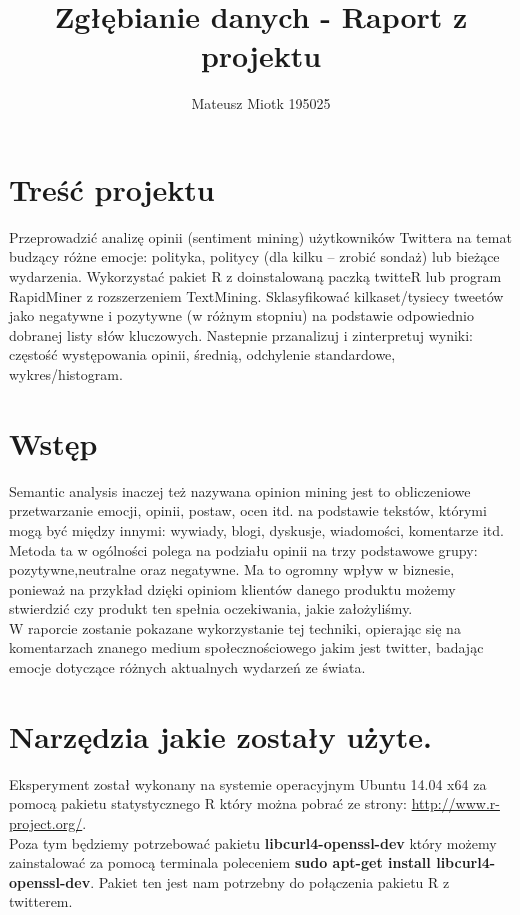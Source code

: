 \documentclass[12pt,a4paper]{article}
\author{Mateusz Miotk 195025}
\title{Zgłębianie danych - Raport z projektu}
\begin{document}
\maketitle
\newpage
\tableofcontents
\newpage

\section[Treść projektu] {Treść projektu}
Przeprowadzić analizę opinii (sentiment mining) użytkowników Twittera na temat 
budzący różne emocje: polityka, politycy (dla kilku – zrobić sondaż) lub bieżące 
wydarzenia. Wykorzystać pakiet R z doinstalowaną paczką twitteR lub program 
RapidMiner z rozszerzeniem TextMining. Sklasyfikować kilkaset/tysiecy tweetów jako 
negatywne i pozytywne (w różnym stopniu) na podstawie odpowiednio dobranej listy 
słów kluczowych. Nastepnie przanalizuj i zinterpretuj wyniki: częstość występowania 
opinii, średnią, odchylenie standardowe, wykres/histogram.
\section[Krótki wstęp dotyczący projektu i jego zastosowania] {Wstęp}
Semantic analysis inaczej też nazywana opinion mining jest to obliczeniowe przetwarzanie emocji, opinii, postaw, ocen itd. na podstawie tekstów, którymi mogą być między innymi: wywiady, blogi, dyskusje, wiadomości, komentarze itd. \\
Metoda ta w ogólności polega na podziału opinii na trzy podstawowe grupy: pozytywne,neutralne oraz negatywne. Ma to ogromny wpływ w biznesie, ponieważ na przykład dzięki opiniom klientów danego produktu możemy stwierdzić czy produkt ten spełnia oczekiwania, jakie założyliśmy.\\
W raporcie zostanie pokazane wykorzystanie tej techniki, opierając się na komentarzach znanego medium społecznościowego jakim jest twitter, badając emocje dotyczące różnych aktualnych wydarzeń ze świata. \\
\section[Narzędzia jakie zostały użyte] {Narzędzia jakie zostały użyte.}
Eksperyment został wykonany na systemie operacyjnym Ubuntu 14.04 x64 za pomocą pakietu statystycznego R który można pobrać ze strony: \url{http://www.r-project.org/}.\\
Poza tym będziemy potrzebować pakietu \textbf{libcurl4-openssl-dev} który możemy zainstalować za pomocą terminala poleceniem \textbf{sudo apt-get install libcurl4-openssl-dev}. Pakiet ten jest nam potrzebny do połączenia pakietu R z twitterem. 
\end{document}
